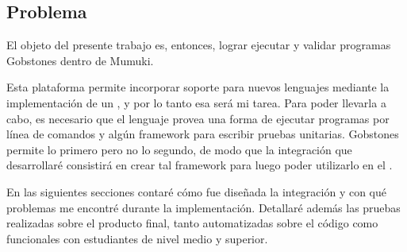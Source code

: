 \subsection{Problema}
El objeto del presente trabajo es, entonces, lograr ejecutar y validar programas Gobstones dentro de Mumuki.

Esta plataforma permite incorporar soporte para nuevos lenguajes mediante la implementación de un \runner, y por lo tanto esa será mi tarea. Para poder llevarla a cabo, es necesario que el lenguaje provea una forma de ejecutar programas por línea de comandos y algún framework para escribir pruebas unitarias. Gobstones permite lo primero pero no lo segundo, de modo que la integración que desarrollaré consistirá en crear tal framework para luego poder utilizarlo en el \runner.

En las siguientes secciones contaré cómo fue diseñada la integración y con qué problemas me encontré durante la implementación. Detallaré además las pruebas realizadas sobre el producto final, tanto automatizadas sobre el código como funcionales con estudiantes de nivel medio y superior.
